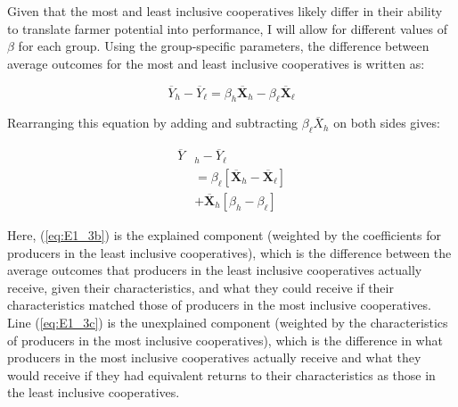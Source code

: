 \documentclass[11pt]{article}
\begin{document}
Given that the most and least inclusive cooperatives likely differ in their ability to translate farmer potential into performance, I will allow for different values of $\beta$ for each group. Using the group-specific parameters, the difference between average outcomes for the most and least inclusive cooperatives is written as:

\begin{equation} \label{eq:E1_2}
        \overline{Y}_{h} - \overline{Y}_{\ell} =  \beta_{h}\overline{\mathbf{X}}_{h} - \beta_{\ell}\overline{\mathbf{X}}_{\ell}
\end{equation}  

Rearranging this equation by adding and subtracting $\beta_{\ell}\overline{X}_{h}$ on both sides gives:

\begin{subequations}
    \begin{align}
        \overline{Y}&_{h} - \overline{Y}_{\ell} \label{eq:E1_3a} \\
        &= \beta_{\ell}[\overline{\mathbf{X}}_{h} - \overline{\mathbf{X}}_{\ell}] \label{eq:E1_3b} \\
        &+ \overline{\mathbf{X}}_{h}[\beta_{h} - \beta_{\ell}] \label{eq:E1_3c}
    \end{align}
\end{subequations}  

Here, (\ref{eq:E1_3b}) is the explained component (weighted by the coefficients for producers in the least inclusive cooperatives), which is the difference between the average outcomes that producers in the least inclusive cooperatives actually receive, given their characteristics, and what they could receive if their characteristics matched those of producers in the most inclusive cooperatives. %
Line (\ref{eq:E1_3c}) is the unexplained component (weighted by the characteristics of producers in the most inclusive cooperatives), which is the difference in what producers in the most inclusive cooperatives actually receive and what they would receive if they had equivalent returns to their characteristics as those in the least inclusive cooperatives.

\end{document}
